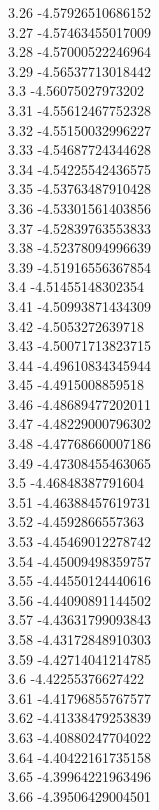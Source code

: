 {3.26	-4.57926510686152\\
3.27	-4.57463455017009\\
3.28	-4.57000522246964\\
3.29	-4.56537713018442\\
3.3	-4.56075027973202\\
3.31	-4.55612467752328\\
3.32	-4.55150032996227\\
3.33	-4.54687724344628\\
3.34	-4.54225542436575\\
3.35	-4.53763487910428\\
3.36	-4.53301561403856\\
3.37	-4.52839763553833\\
3.38	-4.52378094996639\\
3.39	-4.51916556367854\\
3.4	-4.51455148302354\\
3.41	-4.50993871434309\\
3.42	-4.5053272639718\\
3.43	-4.50071713823715\\
3.44	-4.49610834345944\\
3.45	-4.4915008859518\\
3.46	-4.48689477202011\\
3.47	-4.48229000796302\\
3.48	-4.47768660007186\\
3.49	-4.47308455463065\\
3.5	-4.46848387791604\\
3.51	-4.46388457619731\\
3.52	-4.4592866557363\\
3.53	-4.45469012278742\\
3.54	-4.45009498359757\\
3.55	-4.44550124440616\\
3.56	-4.44090891144502\\
3.57	-4.43631799093843\\
3.58	-4.43172848910303\\
3.59	-4.42714041214785\\
3.6	-4.42255376627422\\
3.61	-4.41796855767577\\
3.62	-4.41338479253839\\
3.63	-4.40880247704022\\
3.64	-4.40422161735158\\
3.65	-4.39964221963496\\
3.66	-4.39506429004501\\
}
